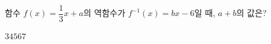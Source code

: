 함수 $f(x)=\dfrac{1}{3}x+a$의 역함수가 $f^{-1}(x)=bx-6$일 때, $a+b$의 값은? 
\begin{choices32}{$3$}{$4$}{$5$}{$6$}{$7$}\end{choices32}
